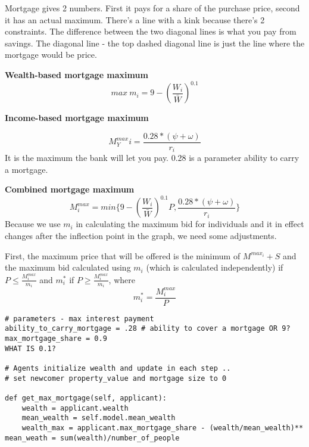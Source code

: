 {Mortgage gives 2 numbers. First it pays for a share of the purchase price, second it has an actual maximum. There's a line with a kink because there's 2 constraints.  The difference between the two diagonal lines is what you pay from savings. 
The diagonal line - the top dashed diagonal line is just the line where the mortgage would be price.

\textbf{Wealth-based mortgage maximum} 
 \[max\ m_i = 9-\left(\frac{W_i}{\bar W}\right)^{0.1} \]


\textbf{Income-based mortgage maximum}

\[M^{max}_Yi = \frac{0.28*(\psi + \omega)}{r_i}\] It is the maximum the bank will let you pay.  0.28 is a parameter {ability to carry a mortgage}.
 
\textbf{Combined mortgage maximum}
\[ M_i^{max} = min \{9-\left(\frac{W_i}{\bar W}\right)^{0.1}P,  \frac{0.28*(\psi + \omega)}{r_i} \}\]
Because we use $m_i$ in calculating the maximum bid for individuals and it in effect changes after the inflection point in the graph, we need some adjustments. 

First, the maximum price that will be offered is the minimum of $M^{max_i} +S$ and the maximum bid calculated using $m_i$ (which is calculated independently) if 
$P\le \frac{M_i^{max}}{m_i}$ 
and $m_i^*$ if 
$P\ge \frac{M_i^{max}}{m_i}$, where 
\[m_i^*=\frac{M_i^{max}}{P}\]

\begin{lstlisting}
# parameters - max interest payment 
ability_to_carry_mortgage = .28 # ability to cover a mortgage OR 9?
max_mortgage_share = 0.9
WHAT IS 0.1?

# Agents initialize wealth and update in each step ..
# set newcomer property_value and mortgage size to 0

def get_max_mortgage(self, applicant):
    wealth = applicant.wealth
    mean_wealth = self.model.mean_wealth
    wealth_max = applicant.max_mortgage_share - (wealth/mean_wealth)**
mean_weath = sum(wealth)/number_of_people


\end{lstlisting}}
